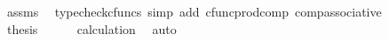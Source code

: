 \begin{isabellebody}
\ assms\ \isamarkupfalse%
\ {\isacharparenleft}{\kern0pt}typecheck{\isacharunderscore}{\kern0pt}cfuncs{\isacharcomma}{\kern0pt}\ simp\ add{\isacharcolon}{\kern0pt}\ cfunc{\isacharunderscore}{\kern0pt}prod{\isacharunderscore}{\kern0pt}comp\ comp{\isacharunderscore}{\kern0pt}associative{}{\isacharparenright}{\kern0pt}\isanewline
\ \ \isamarkupfalse%
\ \isamarkupfalse%
\ {\isacharquery}{\kern0pt}thesis\isanewline
\ \ \ \ \isamarkupfalse%
\ calculation\ \isamarkupfalse%
\ auto\isanewline
{}\isamarkupfalse%
%
\endisatagproof
{\isafoldproof}%
%
\isadelimproof
\isanewline
%
\endisadelimproof
%
\isadelimtheory
\isanewline
%
\endisadelimtheory
%
\isatagtheory
{}\isamarkupfalse%
%
\endisatagtheory
{\isafoldtheory}%
%
\isadelimtheory
%
\endisadelimtheory
%
\end{isabellebody}%
\endinput
